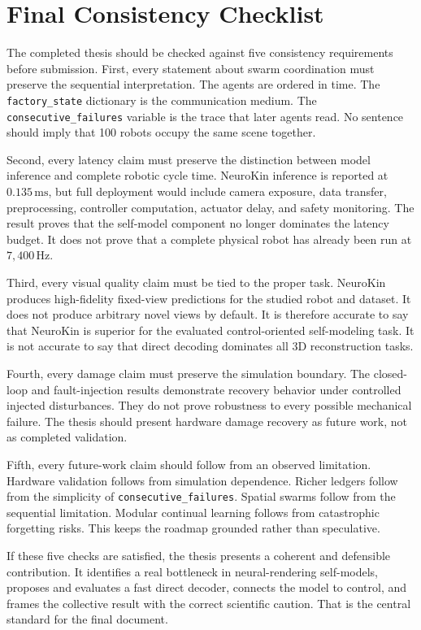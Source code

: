 \documentclass[12pt,a4paper,oneside]{report}
\begin{document}
\section{Final Consistency Checklist}

The completed thesis should be checked against five consistency requirements before submission. First, every statement about swarm coordination must preserve the sequential interpretation. The agents are ordered in time. The \texttt{factory\_state} dictionary is the communication medium. The \texttt{consecutive\_failures} variable is the trace that later agents read. No sentence should imply that 100 robots occupy the same scene together.

Second, every latency claim must preserve the distinction between model inference and complete robotic cycle time. NeuroKin inference is reported at $0.135\,\mathrm{ms}$, but full deployment would include camera exposure, data transfer, preprocessing, controller computation, actuator delay, and safety monitoring. The result proves that the self-model component no longer dominates the latency budget. It does not prove that a complete physical robot has already been run at $7{,}400\,\mathrm{Hz}$.

Third, every visual quality claim must be tied to the proper task. NeuroKin produces high-fidelity fixed-view predictions for the studied robot and dataset. It does not produce arbitrary novel views by default. It is therefore accurate to say that NeuroKin is superior for the evaluated control-oriented self-modeling task. It is not accurate to say that direct decoding dominates all 3D reconstruction tasks.

Fourth, every damage claim must preserve the simulation boundary. The closed-loop and fault-injection results demonstrate recovery behavior under controlled injected disturbances. They do not prove robustness to every possible mechanical failure. The thesis should present hardware damage recovery as future work, not as completed validation.

Fifth, every future-work claim should follow from an observed limitation. Hardware validation follows from simulation dependence. Richer ledgers follow from the simplicity of \texttt{consecutive\_failures}. Spatial swarms follow from the sequential limitation. Modular continual learning follows from catastrophic forgetting risks. This keeps the roadmap grounded rather than speculative.

If these five checks are satisfied, the thesis presents a coherent and defensible contribution. It identifies a real bottleneck in neural-rendering self-models, proposes and evaluates a fast direct decoder, connects the model to control, and frames the collective result with the correct scientific caution. That is the central standard for the final document.
\end{document}
